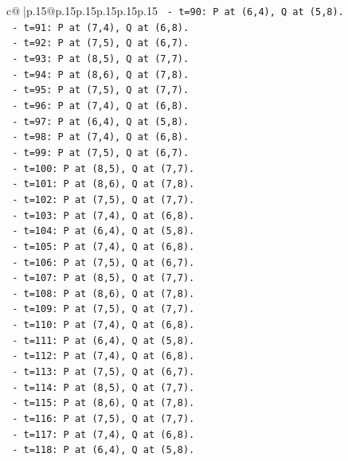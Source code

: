 \documentclass{article}
\begin{document}
{\begin{supertabular}{c@{$\;$}|p{.15\linewidth}@{}p{.15\linewidth}p{.15\linewidth}p{.15\linewidth}p{.15\linewidth}p{.15\linewidth}}
{{{\texttt{      {-} t=90: P at (6,4), Q at (5,8).} \\
\texttt{      {-} t=91: P at (7,4), Q at (6,8).} \\
\texttt{      {-} t=92: P at (7,5), Q at (6,7).} \\
\texttt{      {-} t=93: P at (8,5), Q at (7,7).} \\
\texttt{      {-} t=94: P at (8,6), Q at (7,8).} \\
\texttt{      {-} t=95: P at (7,5), Q at (7,7).} \\
\texttt{      {-} t=96: P at (7,4), Q at (6,8).} \\
\texttt{      {-} t=97: P at (6,4), Q at (5,8).} \\
\texttt{      {-} t=98: P at (7,4), Q at (6,8).} \\
\texttt{      {-} t=99: P at (7,5), Q at (6,7).} \\
\texttt{      {-} t=100: P at (8,5), Q at (7,7).} \\
\texttt{      {-} t=101: P at (8,6), Q at (7,8).} \\
\texttt{      {-} t=102: P at (7,5), Q at (7,7).} \\
\texttt{      {-} t=103: P at (7,4), Q at (6,8).} \\
\texttt{      {-} t=104: P at (6,4), Q at (5,8).} \\
\texttt{      {-} t=105: P at (7,4), Q at (6,8).} \\
\texttt{      {-} t=106: P at (7,5), Q at (6,7).} \\
\texttt{      {-} t=107: P at (8,5), Q at (7,7).} \\
\texttt{      {-} t=108: P at (8,6), Q at (7,8).} \\
\texttt{      {-} t=109: P at (7,5), Q at (7,7).} \\
\texttt{      {-} t=110: P at (7,4), Q at (6,8).} \\
\texttt{      {-} t=111: P at (6,4), Q at (5,8).} \\
\texttt{      {-} t=112: P at (7,4), Q at (6,8).} \\
\texttt{      {-} t=113: P at (7,5), Q at (6,7).} \\
\texttt{      {-} t=114: P at (8,5), Q at (7,7).} \\
\texttt{      {-} t=115: P at (8,6), Q at (7,8).} \\
\texttt{      {-} t=116: P at (7,5), Q at (7,7).} \\
\texttt{      {-} t=117: P at (7,4), Q at (6,8).} \\
\texttt{      {-} t=118: P at (6,4), Q at (5,8).} \\
}}}
\end{supertabular}}
\end{document}
